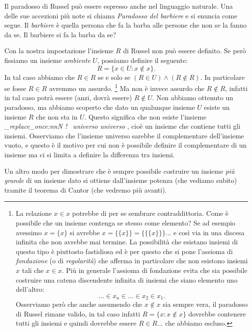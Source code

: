 \documentclass[italian,a4paper,twosides,headinclude]{scrbook}
\newcommand\stripExclamation[1]{
\def\tmp{#1}
\regex_replace_once:nnN { ! } { \  }\tmp
\tmp}
\newcommand{\mynote}[1]{\marginnote{{\footnotesize\stripExclamation{#1}}}}
\newcommand{\myemph}[2][]{%
  \emph{\stripExclamation{#2}}%
  \ifthenelse{\isempty{#1}}%
    {\mynote{#2}%
    \index{#2}}%
    {\mynote{#2}%
     \ifthenelse{\isempty{}}%
      {\index{#2}}%
      {\index{}}}}%
\begin{document}
Il paradosso di Russel può essere espresso anche nel linguaggio naturale.
Una delle sue accezioni più note si chiama \emph{Paradosso del barbiere}
e si enuncia come segue. Il \emph{barbiere} è quella persona che fa la barba
alle persone che non se la fanno da se. Il barbiere si fa la barba da se?

Con la nostra impostazione l'insieme $R$ di Russel non può essere definito.
Se però fissiamo un insieme \emph{ambiente} $U$, possiamo definire il seguente:
\[
  R = \{ x \in U \colon x \not \in x\}.
\]
In tal caso abbiamo che $R\in R$ se e solo se $(R\in U) \land (R\not \in R)$.
In particolare se fosse $R\in R$ avremmo un assurdo.
%
%
\footnote{%
La relazione $x\in x$ potrebbe di per se sembrare contraddittoria.
Come è possibile che un insieme contenga se stesso come elemento?
Se ad esempio avessimo $x=\{ x\}$ si avrebbe $x=\{\{x\}\} = \{\{\{ x\}\}\} \dots$
e così via in una discesa infinita che non avrebbe mai termine.
La possibilità che esistano insiemi di questo tipo è piuttosto fastidiosa ed è per questo
che si pone l'assioma di \emph{fondazione} (o di \emph{regolarità}) che afferma
in particolare che non esistono insiemi $x$ tali che $x\in x$.
Più in generale l'assioma di fondazione evita che sia possibile
costruire una catena discendente infinita di insiemi che siano
elemento uno dell'altro:
\[
  \dots \in x_n \in \dots \in x_2 \in x_1.
\]
Osserviamo però che anche assumendo che $x\not\in x$ sia sempre vera,
il paradosso di Russel rimane valido, in tal caso infatti
$R=\{x\colon x\not \in x\}$ dovrebbe contenere
tutti gli insiemi e quindi dovrebbe essere $R\in R$... che abbiamo escluso.
}
%
%
Ma non è invece
assurdo che $R\not \in R$, infatti in tal caso potrà essere (anzi, dovrà essere)
$R\not \in U$.
Non abbiamo ottenuto un paradosso, ma abbiamo scoperto che dato
un qualunque insieme $U$ esiste un insieme $R$ che non sta in $U$.
Questo significa che non esiste l'insieme \myemph{universo}, cioè un insieme che
contiene tutti gli insiemi. Osserviamo che l'insieme universo sarebbe il complementare
dell'insieme vuoto, e questo è il motivo per cui non è possibile definire
il complementare di un insieme ma ci si limita a definire la differenza tra insiemi.

Un altro modo per dimostrare che è sempre possibile costruire un
insieme \emph{più grande} di un insieme dato si ottiene dall'insieme potenza
(che vediamo subito) tramite il teorema di Cantor (che vedremo più avanti).
\end{document}
